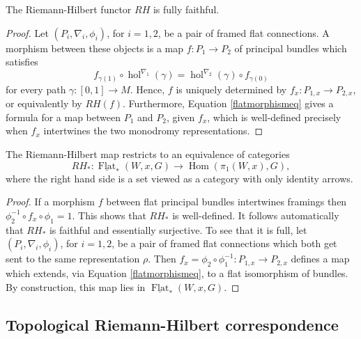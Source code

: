 \documentclass[10pt]{amsart}
\newcommand{\Hom}{\operatorname{Hom}}
\newcommand{\hol}{{\operatorname{hol}}}
\newcommand{\FlatCat}{{\underline{\operatorname{Flat}}}}
\numberwithin{theoremalpha}{section}
\numberwithin{equation}{section}
\numberwithin{definition}{section}
\numberwithin{theorem}{section}
\numberwithin{proposition}{section}
\numberwithin{lemma}{section}
\numberwithin{example}{section}
\numberwithin{remark}{section}
\numberwithin{corollary}{section}
\numberwithin{question}{section}
\numberwithin{problem}{section}
\numberwithin{assumption}{section}
\theoremstyle{named}
\numberwithin{equation}{section}
\begin{document}
\begin{lemma} \label{fulfaith}
The Riemann-Hilbert functor $RH$ is fully faithful. 
\end{lemma}
\begin{proof}
Let $(P_{i}, \nabla_{i}, \phi_{i})$, for $i = 1, 2$, be a pair of framed flat connections. A morphism between these objects is a map $f: P_{1} \to P_{2}$ of principal bundles which satisfies 
\begin{equation} \label{flatmorphismeq}
f_{\gamma(1)} \circ \hol^{\nabla_{1}}(\gamma) = \hol^{\nabla_{2}}(\gamma) \circ f_{\gamma(0)}
\end{equation}
 for every path $\gamma: [0,1] \to M$. Hence, $f$ is uniquely determined by $f_{x} : P_{1, x} \to P_{2, x}$, or equivalently by $RH(f)$. Furthermore, Equation \ref{flatmorphismeq} gives a formula for a map between $P_{1}$ and $P_{2}$, given $f_{x}$, which is well-defined precisely when $f_{x}$ intertwines the two monodromy representations. 
\end{proof}

\begin{corollary} \label{framedRHcorr}
The Riemann-Hilbert map restricts to an equivalence of categories 
\[ RH_{*} : \FlatCat_{*}(W, x,G) \to \Hom(\pi_{1}(W, x), G), \]
where the right hand side is a set viewed as a category with only identity arrows. 
\end{corollary}
\begin{proof}
If a morphism $f$ between flat principal bundles intertwines framings then $\phi_{2}^{-1} \circ f_{x} \circ \phi_{1} = 1$. This shows that $RH_{*}$ is well-defined. It follows automatically that $RH_{*}$ is faithful and essentially surjective. To see that it is full, let $(P_{i}, \nabla_{i}, \phi_{i})$, for $i = 1, 2$, be a pair of framed flat connections which both get sent to the same representation $\rho$. Then $f_{x} = \phi_{2} \circ \phi_{1}^{-1} : P_{1, x} \to P_{2, x}$ defines a map which extends, via Equation \ref{flatmorphismeq}, to a flat isomorphism of bundles. By construction, this map lies in $\FlatCat_{*}(W, x,G)$. 
\end{proof}







\subsection{Topological Riemann-Hilbert correspondence} \label{TopRH}
\end{document}
